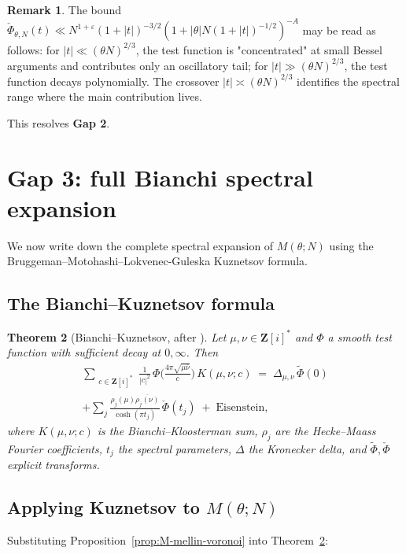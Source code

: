 \documentclass[11pt]{article}
\newtheorem{theorem}{Theorem}[section]
\theoremstyle{definition}
\newtheorem{remark}[theorem]{Remark}
\newcommand{\Z}{\mathbf{Z}}
\newcommand{\Zi}{\Z[i]}
\begin{document}
\begin{remark}\label{rem:transform-bound}
The bound $\check\Phi_{\theta,N}(t)\ll N^{1+\varepsilon}(1+|t|)^{-3/2}(1+|\theta|N(1+|t|)^{-1/2})^{-A}$ may be read as follows: for $|t|\ll(\theta N)^{2/3}$, the test function is "concentrated" at small Bessel arguments and contributes only an oscillatory tail; for $|t|\gg(\theta N)^{2/3}$, the test function decays polynomially. The crossover $|t|\asymp(\theta N)^{2/3}$ identifies the spectral range where the main contribution lives.
\end{remark}

This resolves \textbf{Gap 2}.

\section{Gap 3: full Bianchi spectral expansion}\label{sec:gap3}

We now write down the complete spectral expansion of $M(\theta;N)$ using the Bruggeman--Motohashi--Lokvenec-Guleska Kuznetsov formula.

\subsection{The Bianchi--Kuznetsov formula}

\begin{theorem}[Bianchi--Kuznetsov, after \cite{LG}]\label{thm:bianchi-kuz}
Let $\mu,\nu\in\Zi^*$ and $\Phi$ a smooth test function with sufficient decay at $0,\infty$. Then
\begin{multline}\label{eq:bianchi-kuz}
\sum_{\substack{c\in\Zi^*}}\frac{1}{|c|^2}\,\Phi\Big(\frac{4\pi\sqrt{\mu\bar\nu}}{c}\Big)\,K(\mu,\nu;c)\;=\;\Delta_{\mu,\nu}\,\widetilde\Phi(0)\\
+\sum_j\frac{\rho_j(\mu)\overline{\rho_j(\nu)}}{\cosh(\pi t_j)}\,\check\Phi(t_j)\;+\;\text{Eisenstein},
\end{multline}
where $K(\mu,\nu;c)$ is the Bianchi--Kloosterman sum, $\rho_j$ are the Hecke--Maass Fourier coefficients, $t_j$ the spectral parameters, $\Delta$ the Kronecker delta, and $\widetilde\Phi,\check\Phi$ explicit transforms.
\end{theorem}

\subsection{Applying Kuznetsov to $M(\theta;N)$}

Substituting Proposition~\ref{prop:M-mellin-voronoi} into Theorem~\ref{thm:bianchi-kuz}:
\end{document}
